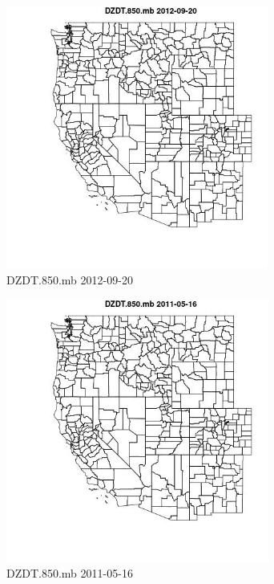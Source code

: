 \begin{figure} 
\centering  
\includegraphics[width=0.77\textwidth]{Code_Outputs/ML_input_report_ML_input_PM25_Step5_part_d_de_duplicated_aves_ML_input_MapObsDZDT850mb2012-09-20.jpg} 
\caption{\label{fig:ML_input_report_ML_input_PM25_Step5_part_d_de_duplicated_aves_ML_inputMapObsDZDT850mb2012-09-20}DZDT.850.mb 2012-09-20} 
\end{figure} 
 

\clearpage 

\begin{figure} 
\centering  
\includegraphics[width=0.77\textwidth]{Code_Outputs/ML_input_report_ML_input_PM25_Step5_part_d_de_duplicated_aves_ML_input_MapObsDZDT850mb2011-05-16.jpg} 
\caption{\label{fig:ML_input_report_ML_input_PM25_Step5_part_d_de_duplicated_aves_ML_inputMapObsDZDT850mb2011-05-16}DZDT.850.mb 2011-05-16} 
\end{figure} 
 

